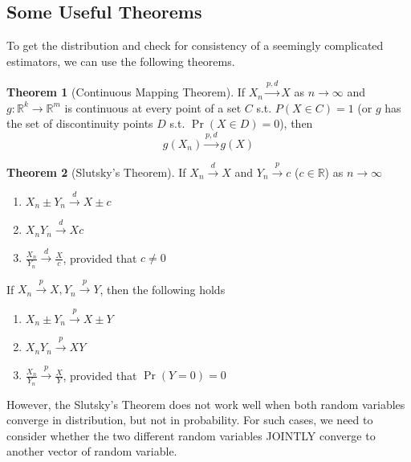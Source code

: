 \documentclass[12pt]{article}
\theoremstyle{definition}
\theoremstyle{property}
\theoremstyle{example}
\newtheorem{theorem}{Theorem}[section]
\begin{document}
\subsection{Some Useful Theorems}
To get the distribution and check for consistency of a seemingly complicated estimators, we can use the following theorems. 
\begin{mdframed}[backgroundcolor=green!5] 

\begin{theorem}[Continuous Mapping Theorem]
If $X_n\xrightarrow{p,d}X$ as $n\to\infty$ and $g:\mathbb{R}^k\to\mathbb{R}^m$ is continuous at every point of a set $C$ s.t. $P(X\in C)=1$ (or $g$  has the set of discontinuity points $D$ s.t. $\Pr(X\in D)=0$), then
\[
g(X_n)\xrightarrow{p,d}g(X)
\]
\end{theorem}

\begin{theorem}[Slutsky's Theorem]
If $X_n\xrightarrow{d}X$ and $Y_n\xrightarrow{p}c$ ($c\in\mathbb{R}$) as $n\to\infty$
\begin{enumerate}
\item $X_n \pm Y_n \xrightarrow{d} X\pm c$
\item $X_nY_n \xrightarrow{d}Xc$
\item $\frac{X_n}{Y_n}\xrightarrow{d} \frac{X}{c}$, provided that $c\neq0$
\end{enumerate}
If $X_n\xrightarrow{p}X, Y_n\xrightarrow{p}Y$, then the following holds
\begin{enumerate}
\item $X_n \pm Y_n \xrightarrow{p} X\pm Y$
\item $X_nY_n \xrightarrow{p}XY$
\item $\frac{X_n}{Y_n}\xrightarrow{p} \frac{X}{Y}$, provided that $\Pr(Y=0)=0$
\end{enumerate}
\end{theorem}
\end{mdframed}\par
However, the Slutsky's Theorem does not work well when both random variables converge in distribution, but not in probability. For such cases, we need to consider whether the two different random variables JOINTLY converge to another vector of random variable. \par
\end{document}
